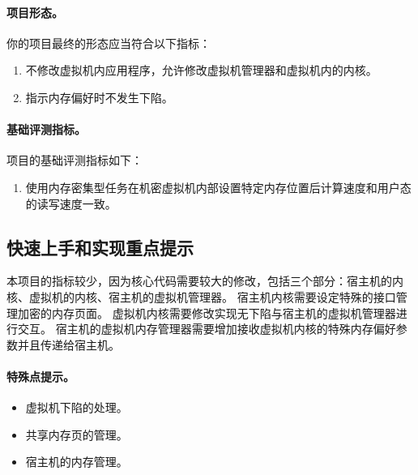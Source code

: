 \paragraph*{项目形态。}
你的项目最终的形态应当符合以下指标：
\begin{enumerate}
    \item 不修改虚拟机内应用程序，允许修改虚拟机管理器和虚拟机内的内核。
    \item 指示内存偏好时不发生下陷。
\end{enumerate}

\paragraph*{基础评测指标。}
项目的基础评测指标如下：
\begin{enumerate}
    \item 使用内存密集型任务在机密虚拟机内部设置特定内存位置后计算速度和用户态的读写速度一致。
\end{enumerate}


\subsection{快速上手和实现重点提示}
本项目的指标较少，因为核心代码需要较大的修改，包括三个部分：宿主机的内核、虚拟机的内核、宿主机的虚拟机管理器。
宿主机内核需要设定特殊的接口管理加密的内存页面。
虚拟机内核需要修改实现无下陷与宿主机的虚拟机管理器进行交互。
宿主机的虚拟机内存管理器需要增加接收虚拟机内核的特殊内存偏好参数并且传递给宿主机。

\paragraph*{特殊点提示。}
\begin{itemize}
    \item 虚拟机下陷的处理。
    \item 共享内存页的管理。
    \item 宿主机的内存管理。
\end{itemize}